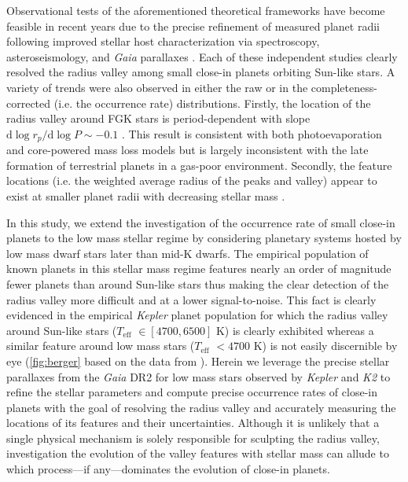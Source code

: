 \documentclass[twocolumn]{emulateapj}
\newcommand{\gaia}[1]{\emph{Gaia}#1}
\newcommand{\kepler}[1]{\emph{Kepler}#1}
\newcommand{\ktwo}[1]{\emph{K2}#1}
\newcommand{\teff}[1]{$T_{\text{eff}}$#1}
\begin{document}
Observational tests of the aforementioned theoretical frameworks have become feasible in recent years due to 
the precise refinement of measured planet radii following improved stellar host characterization via  
spectroscopy, asteroseismology, and \gaia{} parallaxes
\citep[e.g.][]{fulton17,berger18,fulton18,vaneylen18,martinez19}. Each of these independent studies clearly
resolved the radius valley among small close-in planets orbiting Sun-like stars.
A variety of trends were also observed in either
the raw or in the completeness-corrected (i.e. the occurrence rate) distributions. Firstly,
the location of the radius valley around FGK stars is period-dependent with slope
$\mathrm{d}\log{r_p} / \mathrm{d}\log{P} \sim -0.1$ \citep{vaneylen18,martinez19}. This result is consistent
with both photoevaporation and core-powered mass loss models but is largely inconsistent with the late formation
of terrestrial planets in a gas-poor environment. Secondly, the feature locations (i.e. the weighted
average radius of the peaks and valley) appear to exist at smaller planet radii with decreasing stellar
mass \citep{fulton18,wu19}.

In this study, we extend the investigation of the occurrence rate of small close-in planets to the low mass
stellar regime by considering planetary systems hosted by low mass dwarf stars later than mid-K dwarfs.
The empirical population of known planets in this stellar mass regime features nearly an order of magnitude
fewer planets than around Sun-like stars thus making the clear detection of the radius valley more
difficult and at a lower signal-to-noise. This fact is clearly evidenced in the empirical \kepler{} planet population
for which the radius valley around Sun-like stars (\teff{} $\in [4700,6500]$ K) is clearly exhibited whereas a similar
feature around low mass stars (\teff{} $< 4700$ K) is not easily discernible by eye (\autoref{fig:berger} based on
the data from \citealt{berger18}). Herein we leverage the precise stellar parallaxes from the \gaia{} DR2
for low mass stars observed by \kepler{} and \ktwo{} to refine the stellar parameters and compute precise
occurrence rates of close-in planets with the goal of resolving the radius valley and accurately measuring the
locations of its features and their uncertainties. Although it is unlikely that a single physical
mechanism is solely responsible for sculpting the radius valley, investigation the evolution of the valley features
with stellar mass can allude to which process---if any---dominates the evolution of close-in planets.
\end{document}

